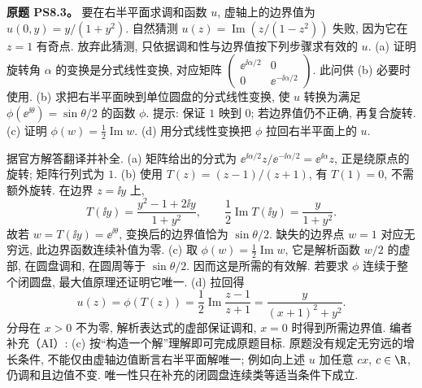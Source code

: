 \begin{exercise}
\textbf{原题 PS8.3。}\label{ass:ps8-3}
要在右半平面求调和函数 $u$, 虚轴上的边界值为 $u(0,y)=y/(1+y^2)$. 自然猜测 $u(z)=\operatorname{Im}(z/(1-z^2))$ 失败, 因为它在 $z=1$ 有奇点. 放弃此猜测, 只依据调和性与边界值按下列步骤求有效的 $u$.
(a) 证明旋转角 $\alpha$ 的变换是分式线性变换, 对应矩阵
$\begin{pmatrix}\ee^{\ii\alpha/2}&0\\0&\ee^{-\ii\alpha/2}\end{pmatrix}$. 此问供 (b) 必要时使用.
(b) 求把右半平面映到单位圆盘的分式线性变换, 使 $u$ 转换为满足 $\phi(\ee^{\ii\theta})=\sin\theta/2$ 的函数 $\phi$. 提示: 保证 $1$ 映到 $0$; 若边界值仍不正确, 再复合旋转.
(c) 证明 $\phi(w)=\tfrac12\operatorname{Im}w$.
(d) 用分式线性变换把 $\phi$ 拉回右半平面上的 $u$.
\end{exercise}
\begin{solution}
据官方解答翻译并补全.
(a) 矩阵给出的分式为 $\ee^{\ii\alpha/2}z/\ee^{-\ii\alpha/2}=\ee^{\ii\alpha}z$, 正是绕原点的旋转; 矩阵行列式为 $1$.
(b) 使用 $T(z)=(z-1)/(z+1)$, 有 $T(1)=0$, 不需额外旋转. 在边界 $z=\ii y$ 上,
\[
 T(\ii y)=\frac{y^2-1+2\ii y}{1+y^2},\qquad
 \frac12\operatorname{Im}T(\ii y)=\frac{y}{1+y^2}.
\]
故若 $w=T(\ii y)=\ee^{\ii\theta}$, 变换后的边界值恰为 $\sin\theta/2$. 缺失的边界点 $w=1$ 对应无穷远, 此边界函数连续补值为零.
(c) 取 $\phi(w)=\tfrac12\operatorname{Im}w$, 它是解析函数 $w/2$ 的虚部, 在圆盘调和, 在圆周等于 $\sin\theta/2$. 因而这是所需的有效解. 若要求 $\phi$ 连续于整个闭圆盘, 最大值原理还证明它唯一.
(d) 拉回得
\[
 u(z)=\phi(T(z))=\frac12\operatorname{Im}\frac{z-1}{z+1}
 =\frac{y}{(x+1)^2+y^2}.
\]
分母在 $x>0$ 不为零, 解析表达式的虚部保证调和, $x=0$ 时得到所需边界值.
编者补充（AI）: (c) 按“构造一个解”理解即可完成原题目标. 原题没有规定无穷远的增长条件, 不能仅由虚轴边值断言右半平面解唯一; 例如向上述 $u$ 加任意 $cx$, $c\in\R$, 仍调和且边值不变. 唯一性只在补充的闭圆盘连续类等适当条件下成立.
\end{solution}

